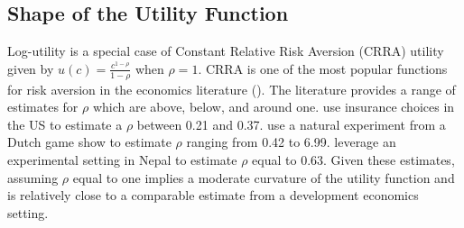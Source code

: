 \documentclass[12pt]{article}
\begin{document}
\begin{table}[H]
\centering
\caption{Sample Construction}\label{table:sampleconstruction}
\vspace{-2mm}
\end{table}



\subsection{Shape of the Utility Function}\label{appendix:utilityshape}

Log-utility is a special case of Constant Relative Risk Aversion (CRRA) utility given by $u(c) = \frac{c^{1-\rho}}{1-\rho}$ when $\rho=1$.  CRRA is one of the most popular functions for risk aversion in the economics literature (\cite{wakker2008explaining}).  The literature provides a range of estimates for $\rho$ which are above, below, and around one.  \cite{barseghyan2013nature} use insurance choices in the US to estimate a $\rho$ between 0.21 and 0.37.  \cite{beetsma2001measuring} use a natural experiment from a Dutch game show to estimate $\rho$ ranging from 0.42 to 6.99.  \cite{carvalho2016effect} leverage an experimental setting in Nepal to estimate $\rho$ equal to 0.63.  Given these estimates, assuming $\rho$ equal to one implies a moderate curvature of the utility function and is relatively close to a comparable estimate from a development economics setting.  
\end{document}
